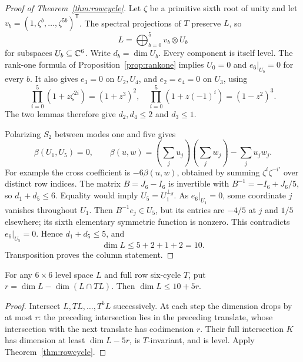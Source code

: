 \begin{proof}[Proof of Theorem~\ref{thm:rowcycle}]
Let $\zeta$ be a primitive sixth root of unity and let $v_b=(1,\zeta^b,\ldots,\zeta^{5b})^{\mathsf T}$. The spectral projections of $T$ preserve $L$, so
\[
 L=\bigoplus_{b=0}^5 v_b\otimes U_b
\]
for subspaces $U_b\subseteq\mathbb C^6$. Write $d_b=\dim U_b$. Every component is itself level. The rank-one formula of Proposition~\ref{prop:rankone} implies $U_0=0$ and $e_6|_{U_b}=0$ for every $b$. It also gives $e_3=0$ on $U_2,U_4$, and $e_2=e_4=0$ on $U_3$, using
\[
 \prod_{i=0}^5(1+z\zeta^{2i})=(1+z^3)^2,
 \quad\prod_{i=0}^5(1+z(-1)^i)=(1-z^2)^3.
\]
The two lemmas therefore give $d_2,d_4\leq2$ and $d_3\leq1$.

Polarizing $S_2$ between modes one and five gives
\[
 \beta(U_1,U_5)=0,\qquad
 \beta(u,w)=\left(\sum_j u_j\right)\left(\sum_jw_j\right)-\sum_ju_jw_j.
\]
For example the cross coefficient is $-6\beta(u,w)$, obtained by summing $\zeta^i\zeta^{-i'}$ over distinct row indices. The matrix $B=J_6-I_6$ is invertible with $B^{-1}=-I_6+J_6/5$, so $d_1+d_5\leq6$. Equality would imply $U_5=U_1^{\perp_\beta}$. As $e_6|_{U_1}=0$, some coordinate $j$ vanishes throughout $U_1$. Then $B^{-1}e_j\in U_5$, but its entries are $-4/5$ at $j$ and $1/5$ elsewhere; its sixth elementary symmetric function is nonzero. This contradicts $e_6|_{U_5}=0$. Hence $d_1+d_5\leq5$, and
\[
 \dim L\leq5+2+1+2=10.
\]
Transposition proves the column statement.
\end{proof}

\begin{corollary}\label{cor:defect}
For any $6\times6$ level space $L$ and full row six-cycle $T$, put
$r=\dim L-\dim(L\cap TL)$. Then $\dim L\leq10+5r$.
\end{corollary}
\begin{proof}
Intersect $L,TL,\ldots,T^5L$ successively. At each step the dimension drops by at most $r$: the preceding intersection lies in the preceding translate, whose intersection with the next translate has codimension $r$. Their full intersection $K$ has dimension at least $\dim L-5r$, is $T$-invariant, and is level. Apply Theorem~\ref{thm:rowcycle}.
\end{proof}


